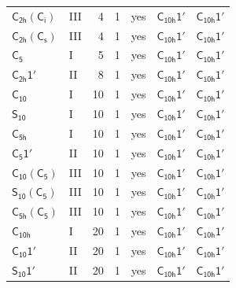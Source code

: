 \documentclass[10pt,a4paper]{article}
\numberwithin{equation}{section}
\newcommand{\grp}[1]{\mathsf{#1}}
\begin{document}
{\begin{longtable}{@{}llrrlll@{}}
\href{C2h-S2.pdf}{$\grp{C_{2h}}(\grp{C_{i}})$} & III & 4 & 1 & yes & \href{C10h-1p.pdf}{$\grp{C_{10h}1'}$} & \href{C10h-1p.pdf}{$\grp{C_{10h}1'}$}\\
\href{C2h-C1v.pdf}{$\grp{C_{2h}}(\grp{C_{s}})$} & III & 4 & 1 & yes & \href{C10h-1p.pdf}{$\grp{C_{10h}1'}$} & \href{C10h-1p.pdf}{$\grp{C_{10h}1'}$}\\
\href{../../../rotation/data/pdf/C5.pdf}{$\grp{C_{5}}$} & I & 5 & 1 & yes & \href{C10h-1p.pdf}{$\grp{C_{10h}1'}$} & \href{C10h-1p.pdf}{$\grp{C_{10h}1'}$}\\
\href{C2h-1p.pdf}{$\grp{C_{2h}1'}$} & II & 8 & 1 & yes & \href{C10h-1p.pdf}{$\grp{C_{10h}1'}$} & \href{C10h-1p.pdf}{$\grp{C_{10h}1'}$}\\
\href{../../../rotation/data/pdf/C10.pdf}{$\grp{C_{10}}$} & I & 10 & 1 & yes & \href{C10h-1p.pdf}{$\grp{C_{10h}1'}$} & \href{C10h-1p.pdf}{$\grp{C_{10h}1'}$}\\
\href{../../../rotation/data/pdf/S10.pdf}{$\grp{S_{10}}$} & I & 10 & 1 & yes & \href{C10h-1p.pdf}{$\grp{C_{10h}1'}$} & \href{C10h-1p.pdf}{$\grp{C_{10h}1'}$}\\
\href{../../../rotation/data/pdf/C5h.pdf}{$\grp{C_{5h}}$} & I & 10 & 1 & yes & \href{C10h-1p.pdf}{$\grp{C_{10h}1'}$} & \href{C10h-1p.pdf}{$\grp{C_{10h}1'}$}\\
\href{C5-1p.pdf}{$\grp{C_{5}1'}$} & II & 10 & 1 & yes & \href{C10h-1p.pdf}{$\grp{C_{10h}1'}$} & \href{C10h-1p.pdf}{$\grp{C_{10h}1'}$}\\
\href{C10-C5.pdf}{$\grp{C_{10}}(\grp{C_{5}})$} & III & 10 & 1 & yes & \href{C10h-1p.pdf}{$\grp{C_{10h}1'}$} & \href{C10h-1p.pdf}{$\grp{C_{10h}1'}$}\\
\href{S10-C5.pdf}{$\grp{S_{10}}(\grp{C_{5}})$} & III & 10 & 1 & yes & \href{C10h-1p.pdf}{$\grp{C_{10h}1'}$} & \href{C10h-1p.pdf}{$\grp{C_{10h}1'}$}\\
\href{C5h-C5.pdf}{$\grp{C_{5h}}(\grp{C_{5}})$} & III & 10 & 1 & yes & \href{C10h-1p.pdf}{$\grp{C_{10h}1'}$} & \href{C10h-1p.pdf}{$\grp{C_{10h}1'}$}\\
\href{../../../rotation/data/pdf/C10h.pdf}{$\grp{C_{10h}}$} & I & 20 & 1 & yes & \href{C10h-1p.pdf}{$\grp{C_{10h}1'}$} & \href{C10h-1p.pdf}{$\grp{C_{10h}1'}$}\\
\href{C10-1p.pdf}{$\grp{C_{10}1'}$} & II & 20 & 1 & yes & \href{C10h-1p.pdf}{$\grp{C_{10h}1'}$} & \href{C10h-1p.pdf}{$\grp{C_{10h}1'}$}\\
\href{S10-1p.pdf}{$\grp{S_{10}1'}$} & II & 20 & 1 & yes & \href{C10h-1p.pdf}{$\grp{C_{10h}1'}$} & \href{C10h-1p.pdf}{$\grp{C_{10h}1'}$}\\

\end{longtable}}
\end{document}
